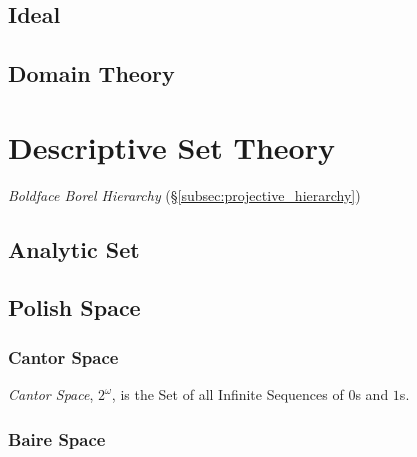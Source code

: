 \documentclass{article}
\begin{document}
\subsection{Ideal}\label{subsec:order_ideal}



\subsection{Domain Theory}\label{subsec:domain_theory}



\section{Descriptive Set Theory}

\emph{Boldface Borel Hierarchy} (\S\ref{subsec:projective_hierarchy})

\subsection{Analytic Set}\label{subsec:analytic_set}

\subsection{Polish Space}\label{subsec:polish_space}

\subsubsection{Cantor Space}

\emph{Cantor Space}, $2^{\omega}$, is the Set of all Infinite
Sequences of $0$s and $1$s.



\subsubsection{Baire Space}
\end{document}
